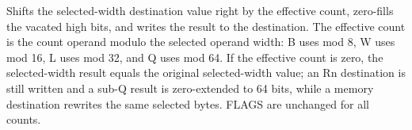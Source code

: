 Shifts the selected-width destination value right by the effective count, zero-fills the vacated high bits, and writes the result to the destination. The effective count is the count operand modulo the selected operand width: B uses mod 8, W uses mod 16, L uses mod 32, and Q uses mod 64. If the effective count is zero, the selected-width result equals the original selected-width value; an Rn destination is still written and a sub-Q result is zero-extended to 64 bits, while a memory destination rewrites the same selected bytes. FLAGS are unchanged for all counts.
